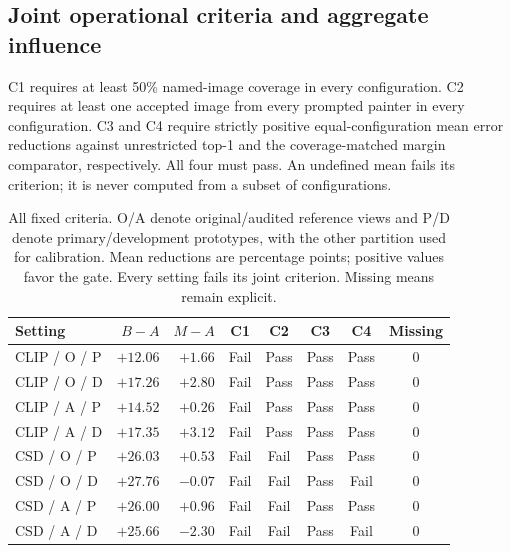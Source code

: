 \subsection{Joint operational criteria and aggregate influence}
C1 requires at least 50\% named-image coverage in every configuration. C2 requires at least one accepted image from every prompted painter in every configuration. C3 and C4 require strictly positive equal-configuration mean error reductions against unrestricted top-1 and the coverage-matched margin comparator, respectively. All four must pass. An undefined mean fails its criterion; it is never computed from a subset of configurations.
\begin{table}[!htbp]
\caption{All fixed criteria. O/A denote original/audited reference views and P/D denote primary/development prototypes, with the other partition used for calibration. Mean reductions are percentage points; positive values favor the gate. Every setting fails its joint criterion. Missing means remain explicit.}
\label{tab:selective-criteria}
\centering\footnotesize\setlength{\tabcolsep}{3pt}
\begin{tabularx}{\linewidth}{@{}Xrrccccc@{}}\toprule
Setting & $B-A$ & $M-A$ & C1 & C2 & C3 & C4 & Missing\\\midrule
CLIP / O / P & $+12.06$ & $+1.66$ & Fail & Pass & Pass & Pass & 0\\
CLIP / O / D & $+17.26$ & $+2.80$ & Fail & Pass & Pass & Pass & 0\\
CLIP / A / P & $+14.52$ & $+0.26$ & Fail & Pass & Pass & Pass & 0\\
CLIP / A / D & $+17.35$ & $+3.12$ & Fail & Pass & Pass & Pass & 0\\
CSD / O / P & $+26.03$ & $+0.53$ & Fail & Fail & Pass & Pass & 0\\
CSD / O / D & $+27.76$ & $-0.07$ & Fail & Fail & Pass & Fail & 0\\
CSD / A / P & $+26.00$ & $+0.96$ & Fail & Fail & Pass & Pass & 0\\
CSD / A / D & $+25.66$ & $-2.30$ & Fail & Fail & Pass & Fail & 0\\
\bottomrule\end{tabularx}
\end{table}
